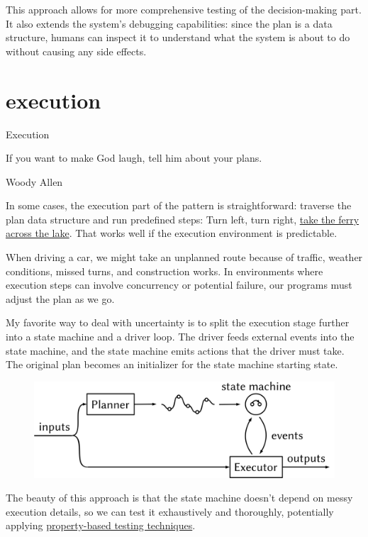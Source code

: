 \documentclass{article}
\begin{document}
This approach allows for more comprehensive testing of the decision-making part.
It also extends the system's debugging capabilities: since the plan is a data structure, humans can inspect it to understand what the system is about to do without causing any side effects.

\section{execution}{Execution}

\epigraph{If you want to make God laugh, tell him about your plans.}{Woody Allen}

In some cases, the execution part of the pattern is straightforward: traverse the plan data structure and run predefined steps:
Turn left, turn right, \href{https://xkcd.com/461/}{take the ferry across the lake}.
That works well if the execution environment is predictable.

When driving a car, we might take an unplanned route because of traffic, weather conditions, missed turns, and construction works.
In environments where execution steps can involve concurrency or potential failure, our programs must adjust the plan as we go.

My favorite way to deal with uncertainty is to split the execution stage further into a state machine and a driver loop.
The driver feeds external events into the state machine, and the state machine emits actions that the driver must take.
The original plan becomes an initializer for the state machine starting state.

\begin{figure}[grayscale-diagram]
\includegraphics{images/29-dynamic-planning.svg}
\end{figure}

The beauty of this approach is that the state machine doesn't depend on messy execution details,
so we can test it exhaustively and thoroughly,
potentially applying \href{https://propertesting.com/book_state_machine_properties.html}{property-based testing techniques}.
\end{document}
